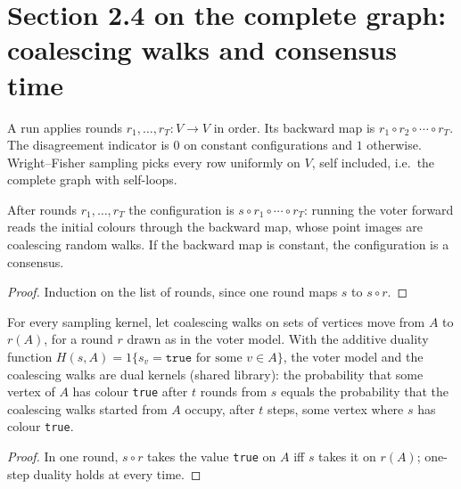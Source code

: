 \section{Section 2.4 on the complete graph: coalescing walks and consensus time}
\begin{definition}\label{def:backward}
\leanok{}
A run applies rounds $r_1,\dots,r_T\colon V\to V$ in order. Its backward map is
$r_1\circ r_2\circ\cdots\circ r_T$. The disagreement indicator is $0$ on constant
configurations and $1$ otherwise. Wright--Fisher sampling picks every row uniformly
on $V$, self included, i.e.\ the complete graph with self-loops.
\end{definition}
\begin{lemma}\label{lem:duality}
\leanok{}
After rounds $r_1,\dots,r_T$ the configuration is $s\circ r_1\circ\cdots\circ r_T$:
running the voter forward reads the initial colours through the backward map, whose
point images are coalescing random walks. If the backward map is constant, the
configuration is a consensus.
\end{lemma}
\begin{proof}\leanok
Induction on the list of rounds, since one round maps $s$ to $s\circ r$.
\end{proof}
\begin{theorem}\label{thm:coalescing-dual}
\leanok{}
For every sampling kernel, let coalescing walks on sets of vertices move from $A$ to $r(A)$, for a
round $r$ drawn as in the voter model. With the additive duality function
$H(s,A)=1\{s_v=\mathtt{true}\text{ for some }v\in A\}$, the voter model and the coalescing walks
are dual kernels (shared library): the probability that some vertex of $A$ has colour
\texttt{true} after $t$ rounds from $s$ equals the probability that the coalescing walks started
from $A$ occupy, after $t$ steps, some vertex where $s$ has colour \texttt{true}.
\end{theorem}
\begin{proof}\leanok
In one round, $s\circ r$ takes the value \texttt{true} on $A$ iff $s$ takes it on $r(A)$; one-step
duality holds at every time.
\end{proof}
